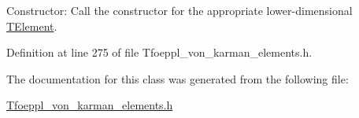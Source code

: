 Constructor\+: Call the constructor for the appropriate lower-\/dimensional \hyperlink{classoomph_1_1TElement}{T\+Element}. 



Definition at line 275 of file Tfoeppl\+\_\+von\+\_\+karman\+\_\+elements.\+h.



The documentation for this class was generated from the following file\+:\begin{DoxyCompactItemize}
\item 
\hyperlink{Tfoeppl__von__karman__elements_8h}{Tfoeppl\+\_\+von\+\_\+karman\+\_\+elements.\+h}\end{DoxyCompactItemize}
